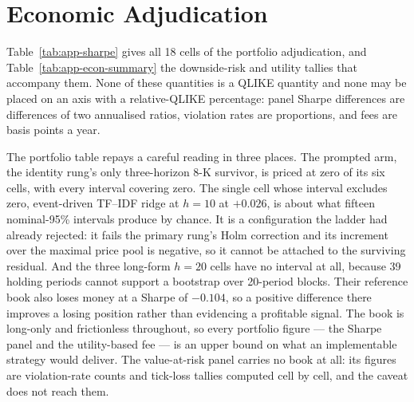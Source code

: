 \clearpage

\FloatBarrier
\section{Economic Adjudication}
\label{app:res-econ}

Table~\ref{tab:app-sharpe} gives all 18 cells of the portfolio
adjudication, and Table~\ref{tab:app-econ-summary} the downside-risk and
utility tallies that accompany them. None of these quantities is a
QLIKE quantity and none may be placed on an axis with a relative-QLIKE
percentage: panel Sharpe differences are differences of two annualised
ratios, violation rates are proportions, and fees are basis points a
year.

The portfolio table repays a careful reading in three places. The
prompted arm, the identity rung's only three-horizon 8-K survivor, is priced at
zero of its six cells, with every interval covering zero. The single
cell whose interval excludes zero, event-driven TF--IDF ridge at
$h{=}10$ at $+0.026$, is about what fifteen nominal-95\% intervals
produce by chance. It is a configuration the ladder had already
rejected: it fails the primary rung's Holm correction and its increment
over the maximal price pool is negative, so it cannot be attached to the
surviving residual. And the three long-form $h{=}20$ cells have no
interval at all, because 39 holding periods cannot support a bootstrap
over 20-period blocks. Their reference book also loses money at a
Sharpe of $-0.104$, so a positive difference there improves a losing
position rather than evidencing a profitable signal. The book is
long-only and frictionless throughout, so every portfolio figure --- the
Sharpe panel and the utility-based fee --- is an upper bound on what an
implementable strategy would deliver. The value-at-risk panel carries no book
at all: its figures are violation-rate counts and tick-loss tallies computed
cell by cell, and the caveat does not reach them.

